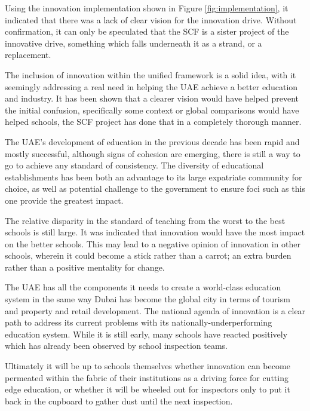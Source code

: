 Using the innovation implementation shown in Figure \ref{fig:implementation}, it indicated that there was a lack of clear vision for the innovation drive. Without confirmation, it can only be speculated that the SCF is a sister project  of the innovative drive, something which falls underneath it as a strand, or a replacement.

The inclusion of innovation within the unified framework is a solid idea, with it seemingly addressing a real need in helping the UAE achieve a better education and industry. It has been shown that a clearer vision would have helped prevent the initial confusion, specifically some context or global comparisons would have helped schools, the SCF project has done that in a completely thorough manner.

The UAE’s development of education in the previous decade has been rapid and mostly successful, although signs of cohesion are emerging, there is still a way to go to achieve any standard of consistency. The diversity of educational establishments has been both an advantage to its large expatriate community for choice, as well as potential challenge to the government to ensure foci such as this one provide the greatest impact.

The relative disparity in the standard of teaching from the worst to the best schools is still large.  It was indicated that innovation would have the most impact on the better schools. This may lead to a negative opinion of innovation in other schools, wherein it could become a stick rather than a carrot; an extra burden rather than a positive mentality for change.

The UAE has all the components it needs to create a world-class education system in the same way Dubai has become the global city in terms of tourism and property and retail development. The national agenda of innovation is a clear path to address its current problems with its nationally-underperforming education system. While it is still early, many schools have reacted positively which has already been observed by school inspection teams.

Ultimately it will be up to schools themselves whether innovation can become permeated within the fabric of their institutions as a driving force for cutting edge education, or whether it will be wheeled out for inspectors only to put it back in the cupboard to gather dust until the next inspection.

